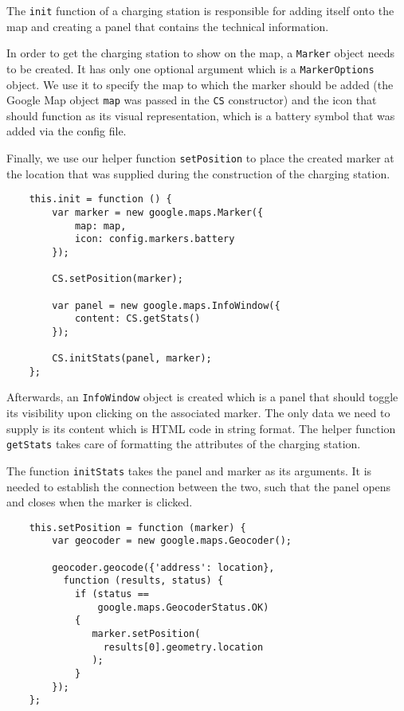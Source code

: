 The \texttt{init} function of a charging station is responsible for adding itself onto the map and creating a panel that contains the technical information.

In order to get the charging station to show on the map, a \texttt{Marker} object needs to be created. It has only one optional argument which is a \texttt{MarkerOptions} object. We use it to specify the map to which the marker should be added (the Google Map object \texttt{map} was passed in the \texttt{CS} constructor) and the icon that should function as its visual representation, which is a battery symbol that was added via the config file.

Finally, we use our helper function \texttt{setPosition} to place the created marker at the location that was supplied during the construction of the charging station.

\begin{verbatim}
    this.init = function () {
        var marker = new google.maps.Marker({
            map: map,
            icon: config.markers.battery
        });

        CS.setPosition(marker);

        var panel = new google.maps.InfoWindow({
            content: CS.getStats()
        });

        CS.initStats(panel, marker);
    };
\end{verbatim}

Afterwards, an \texttt{InfoWindow} object is created which is a panel that should toggle its visibility upon clicking on the associated marker. The only data we need to supply is its content which is HTML code in string format. The helper function \texttt{getStats} takes care of formatting the attributes of the charging station.

The function \texttt{initStats} takes the panel and marker as its arguments. It is needed to establish the connection between the two, such that the panel opens and closes when the marker is clicked.

\begin{verbatim}
    this.setPosition = function (marker) {
        var geocoder = new google.maps.Geocoder();

        geocoder.geocode({'address': location},
          function (results, status) {
            if (status ==
                google.maps.GeocoderStatus.OK)
            {
               marker.setPosition(
                 results[0].geometry.location
               );
            }
        });
    };
\end{verbatim}

